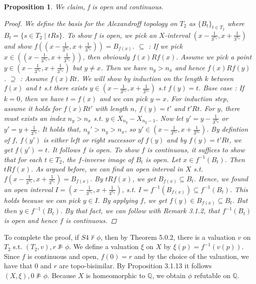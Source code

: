 \documentclass[12pt, a4paper]{scrartcl}
\newtheorem{proposition}[definition]{Proposition}
\begin{document}
\begin{proposition}
    We claim, f is open and continuous.

    \begin{proof}
        We define the basis for the Alexandroff topology on $T_2$ as $\{B_t\}_{t \in T_2}$ where $B_t = \{s \in T_2 \mid tRs\}$.
        To show f is open, we pick an $X$-interval $(x - \frac{1}{3^{n_x}}, x + \frac{1}{3^{n_x}})$ and show 
        $f((x - \frac{1}{3^{n_x}}, x + \frac{1}{3^{n_x}})) = B_{f(x)}$. \newline
        $\subseteq$ : If we pick $x \in ((x - \frac{1}{3^{n_x}}, x + \frac{1}{3^{n_x}}))$, then obviously $f(x)Rf(x)$. Assume we pick a point 
        $y \in (x - \frac{1}{3^{n_x}}, x + \frac{1}{3^{n_x}})$ but $y \neq x$. Then we have $n_y > n_x$ and hence $f(x) R f(y)$. \newline
        $\supseteq$ : Assume $f(x)Rt$. We will show by induction on the length $k$ between $f(x)$ and $t$ s.t there exists $y \in (x - \frac{1}{3^{n_x}}, x + \frac{1}{3^{n_x}})$ s.t $f(y) = t$.
        Base case : If $k = 0$, then we have $t = f(x)$ and we can pick $y = x$. For induction step, assume it holds for $f(x)Rt'$ with length $n$, $f(y) = t'$ and $t'Rt$.
        For $y$, there must exists an index $n_y > n_x$ s.t. $y \in X_{n_y} - X_{n_y -1}$. 
        Now let $y' = y - \frac{1}{3^{n_y}}$ or $y' = y + \frac{1}{3^{n_y}}$. It holds that, $n_y' > n_y > n_x$, so $y' \in (x - \frac{1}{3^{n_x}}, x + \frac{1}{3^{n_x}})$.
        By defintion of $f$, $f(y')$ is either left or right successor of $f(y)$ and by $f(y)= t' R t$, we get $f(y') = t$. It follows $f$ is open. \newline
        To show $f$ is continuous, it suffices to show that for each $t \in T_2$, the $f$-inverse image of $B_t$ is open. Let $x \in f^{-1}(B_t)$. Then $tRf(x)$. As argued before, we can find an open interval in $X$ s.t.
        $f (x - \frac{1}{3^{n_x}}, x + \frac{1}{3^{n_x}}) = B_{f(x)}$.  By $tRf(x)$, we get $B_{f(x)} \subseteq B_t$. Hence, we found an open interval
        $I = (x - \frac{1}{3^{n_x}}, x + \frac{1}{3^{n_x}})$, s.t. $I = f^{-1}(B_{f(x)}) \subseteq f^{-1}(B_t)$. This holds because we can pick $y \in I$. By applying $f$, we get $f(y) \in B_{f(x)} \subseteq B_t$. But then $y \in f^{-1}(B_t)$.
        By that fact, we can follow with Remark 3.1.2, that $f^{-1}(B_t)$ is open and hence $f$ is continuous.

    \end{proof}

\end{proposition}
To complete the proof, if $S4 \nvdash \phi$, then by Theorem 5.0.2, there is a valuation $v$ on $T_2$ s.t. $(T_2, v), r \nVDash \phi$. We define a valuation $\xi$ on $X$ by $\xi(p) = f^{-1}(v(p))$. Since $f$ is continuous and open, $f(0) = r$ and by the choice 
of the valuation, we have that $0$ and $r$ are topo-bisimilar. By Proposition 3.1.13 it follows $(X, \xi), 0 \nVDash \phi$. Because $X$ is homeomorphic to $\mathbb{Q}$, we obtain $\phi$ refutable on $\mathbb{Q}$.
\end{document}
